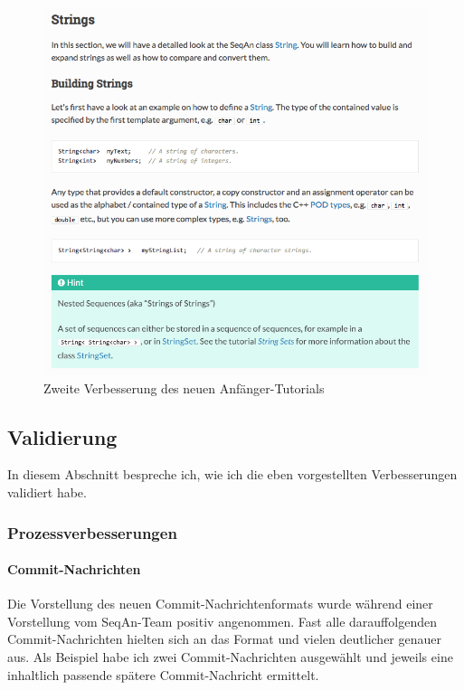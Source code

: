 \begin{figure}
  \centering
    \includegraphics[width=0.55\linewidth]{Figures/tutorial-improved2.png}
  \caption{Zweite Verbesserung des neuen Anfänger-Tutorials}
  \label{fig:tutorial-improved2}
\end{figure}




\subsection{Validierung}
\label{sec:phase1-validierung}

In diesem Abschnitt bespreche ich, wie ich die eben vorgestellten Verbesserungen validiert habe.

\subsubsection{Prozessverbesserungen}

\paragraph{Commit-Nachrichten} Die Vorstellung des neuen Commit-Nachrichtenformats wurde während einer Vorstellung vom SeqAn-Team positiv angenommen. Fast alle darauffolgenden Commit-Nachrichten hielten sich an das Format und vielen deutlicher genauer aus. Als Beispiel habe ich zwei Commit-Nachrichten ausgewählt und jeweils eine inhaltlich passende spätere Commit-Nachricht ermittelt.


